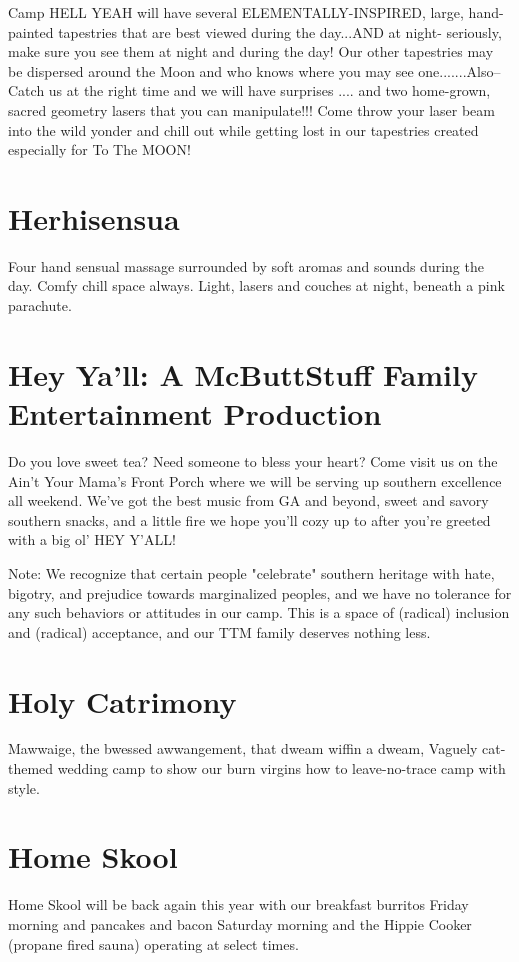 \begin{multicols}{2}
Camp HELL YEAH will have several ELEMENTALLY-INSPIRED, large, hand-painted tapestries that are best viewed  during the day...AND at night- seriously, make sure you see them at night and during the day! Our other tapestries may be dispersed around the Moon and who knows where you may see one.......Also-- Catch us at the right time and we will have surprises .... and two home-grown, sacred geometry lasers that you can manipulate!!! Come throw your laser beam into the wild yonder and chill out while getting lost in our tapestries created especially for To The MOON!  



\section*{Herhisensua}
Four hand sensual massage surrounded by soft aromas and sounds during the day. Comfy chill space always. Light, lasers and couches at night, beneath a pink parachute. 


\section*{Hey Ya’ll: A McButtStuff Family Entertainment Production}
Do you love sweet tea? Need someone to bless your heart? Come visit us on the Ain't Your Mama's Front Porch where we will be serving up southern excellence all weekend. We've got the best music from GA and beyond, sweet and savory southern snacks, and a little fire we hope you'll cozy up to after you're greeted with a big ol' HEY Y'ALL! 

Note: We recognize that certain people "celebrate" southern heritage with hate, bigotry, and prejudice towards marginalized peoples, and we have no tolerance for any such behaviors or attitudes in our camp. This is a space of (radical) inclusion and (radical) acceptance, and our TTM family deserves nothing less. 


\section*{Holy Catrimony}
Mawwaige, the bwessed awwangement, that dweam wiffin a dweam,  Vaguely cat-themed wedding camp to show our burn virgins how to leave-no-trace camp with style.


\section*{Home Skool}
Home Skool will be back again this year with our breakfast burritos Friday morning and pancakes and bacon Saturday morning and the Hippie Cooker (propane fired sauna) operating at select times. 



\end{multicols}
